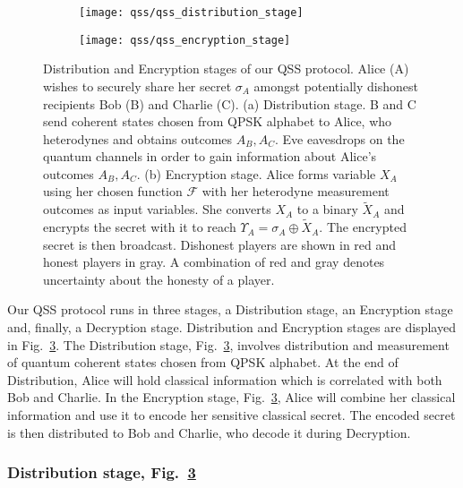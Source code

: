 \begin{figure}[htp]
\captionsetup{width=\linewidth}
\centering
	\begin{subfigure}{0.8\linewidth}
		\centering
		\label{fig:qss_distribution_stage}
		\texttt{[image: qss/qss\_distribution\_stage]}
	\end{subfigure}
	\begin{subfigure}{0.8\linewidth}
		\centering
		\label{fig:qss_encryption_stage}
		\texttt{[image: qss/qss\_encryption\_stage]}
		
	\end{subfigure}
\caption{\label{fig:qss_protocol_cartoon} Distribution and Encryption stages of our QSS protocol. Alice (A) wishes to securely share her secret $\sigma_A$ amongst potentially dishonest recipients Bob (B) and Charlie (C). (a) Distribution stage. B and C send coherent states chosen from QPSK alphabet to Alice, who heterodynes and obtains outcomes $A_B, A_C$. Eve eavesdrops on the quantum channels in order to gain information about Alice's outcomes $A_B, A_C$. (b) Encryption stage. Alice forms variable $X_A$ using her chosen function $\mathcal{F}$ with her heterodyne measurement outcomes as input variables. She converts $X_A$ to a binary $\tilde{X}_A$ and encrypts the secret with it to reach $\Upsilon_A = \sigma_A \oplus \tilde{X}_A$. The encrypted secret is then broadcast. Dishonest players are shown in red and honest players in gray. A combination of red and gray denotes uncertainty about the honesty of a player.
}
\end{figure}


Our QSS protocol runs in three stages, a Distribution stage, an Encryption stage and, finally, a Decryption stage. Distribution and Encryption stages are displayed in Fig.~\ref{fig:qss_protocol_cartoon}. The Distribution stage, Fig.~\ref{fig:qss_protocol_cartoon}, involves distribution and measurement of quantum coherent states chosen from QPSK alphabet. At the end of Distribution, Alice will hold classical information which is correlated with both Bob and Charlie. In the Encryption stage, Fig.~\ref{fig:qss_protocol_cartoon}, Alice will combine her classical information and use it to encode her sensitive classical secret. The encoded secret is then distributed to Bob and Charlie, who decode it during Decryption. 


\subsubsection*{Distribution stage, Fig.~\ref{fig:qss_protocol_cartoon}}
